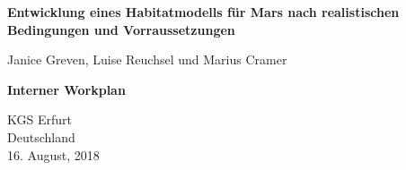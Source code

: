 \begin{titlepage}
  \begin{center}
      \vspace*{1cm}

      \huge
      \textbf{Entwicklung eines Habitatmodells für Mars nach realistischen Bedingungen und Vorraussetzungen}

      \vspace{1.5cm}

      \large
      Janice Greven, Luise Reuchsel und Marius Cramer

      \vfill

      \large
      \textbf{Interner Workplan}

      \vspace{0.8cm}


      \normalsize
      KGS Erfurt\\
      Deutschland\\
      16. August, 2018

  \end{center}
\end{titlepage}
